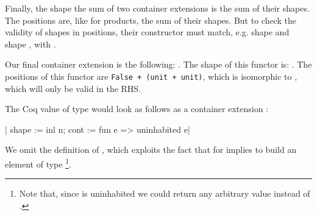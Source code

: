 \documentclass[anonymous, a4paper, UKenglish, cleveref, autoref, thm-restate]{lipics-v2021}
\begin{document}
Finally, the shape the sum of two container extensions is the sum of their
shapes. The positions are, like for products, the sum of their shapes. But to
check the validity of shapes in positions, their constructor must match, e.g.
shape  and shape , with
. 

Our final container extension is the following: 
.
The shape of this functor is: 
. The positions of this functor
are \texttt{False + (unit + unit)}, which is isomorphic
to , which will only be valid in the RHS.

The Coq value  of type
 would look as follows as a container
extension 
:
\begin{coqcode}
{| shape := inl n; cont := fun e => uninhabited e|}
\end{coqcode}
We omit the definition of , which exploits the
fact that  for  implies
 to build an element of type %
\footnote{Note that, since  is uninhabited we could return
any arbitrary value instead of .}.
\end{document}

